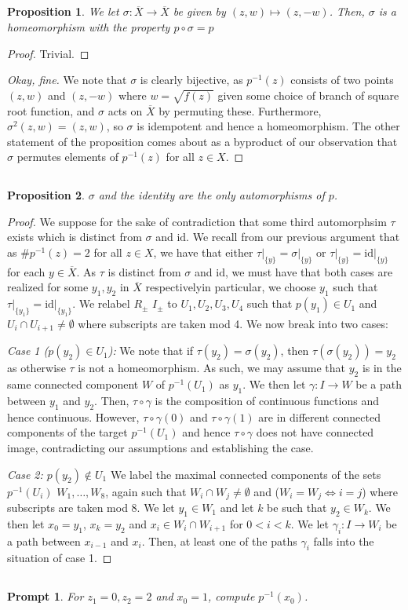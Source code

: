 \documentclass[english]{article}
\newcommand{\evat}[3]{\left. #1\right|_{#2}^{#3}}
\newcommand{\restr}[2]{\evat{#1}{#2}{}}
\newcommand{\prt}[1]{\setcounter{subsection}{#1-1}\subsection{}}
\newtheorem*{proposition*}{Proposition}
\newtheorem*{prompt*}{Prompt}
\theoremstyle{remark}
\theoremstyle{definition}
\newcommand{\id}{\mathrm{id}}
\newcommand{\oX}{\overline{X}}
\begin{document}
\prt{2}
\begin{proposition*}
	We let $\sigma:\oX\to\oX$ be given by $(z,w)\mapsto (z,-w)$. Then, $\sigma$ is a homeomorphism with the property $p\circ \sigma=p$
\end{proposition*}
\begin{proof}
	Trivial.
\end{proof}
\begin{proof}[Okay, fine]
	We note that $\sigma$ is clearly bijective, as $p^{-1}(z)$ consists of two points $(z,w)$ and $(z,-w)$ where $w=\sqrt{f(z)}$ given some choice of branch of square root function, and $\sigma$ acts on $\oX$ by permuting these. Furthermore, $\sigma^2(z,w)=(z,w)$, so $\sigma$ is idempotent and hence a homeomorphism. The other statement of the proposition comes about as a byproduct of our observation that $\sigma$ permutes elements of $p^{-1}(z)$ for all $z\in X$. 
\end{proof}
\prt{3}\begin{proposition*}
	$\sigma$ and the identity are the only automorphisms of $p$.
\end{proposition*}
\begin{proof} We suppose for the sake of contradiction that some third automorphsim $\tau$ exists which is distinct from $\sigma$ and $\id$. 
	We recall from our previous argument that as $\#p^{-1}(z)=2$ for all $z\in X$, we have that either $\restr{\tau}{\{y\}}=\restr{\sigma}{\{y\}}$ or $\restr{\tau}{\{y\}}=\restr{\id}{\{y\}}$ for each $y\in \oX$. As $\tau$ is distinct from $\sigma$ and $\id$, we must have that both cases are realized for some $y_1,y_2$ in $\oX$ respectively\textemdash in particular, we choose $y_1$ such that $\restr{\tau}{\{y_1\}}=\restr{\id}{\{y_1\}}$. We relabel $R_\pm$ $I_\pm$ to $U_1,U_2,U_3,U_4$ such that $p(y_1)\in U_1$ and $U_i\cap U_{i+1}\neq \emptyset$ where subscripts are taken mod 4. We now break into two cases:
	
	\emph{Case 1 ($p(y_2)\in U_1$):} We note that if $\tau(y_2)=\sigma(y_2)$, then $\tau(\sigma(y_2))=y_2$ as otherwise $\tau$ is not a homeomorphism. As such, we may assume that $y_2$ is in the same connected component $W$ of $p^{-1}(U_1)$ as $y_1$. We then let $\gamma:I\to W$ be a path between $y_1$ and $y_2$. Then, $\tau\circ \gamma$ is the composition of continuous functions and hence continuous. However, $\tau\circ\gamma(0)$ and $\tau\circ \gamma (1)$ are in different connected components of the target $p^{-1}(U_1)$ and hence $\tau\circ \gamma$ does not have connected image, contradicting our assumptions and establishing the case.
	
	\emph{Case 2: $p(y_2)\notin U_1$} We label the maximal connected components of the sets $p^{-1}(U_i)$ $W_1,\hdots,W_8$, again such that $W_i\cap W_j\neq \emptyset$ and ($W_i=W_j\iff i=j$) where subscripts are taken mod 8. We let $y_1\in W_1$ and let $k$ be such that $y_2\in W_k$. We then let $x_0=y_1$, $x_k=y_2$ and $x_i\in W_i\cap W_{i+1}$ for $0<  i <k$. We let $\gamma_i:I\to W_i$ be a path between $x_{i-1}$ and $x_i$. Then, at least one of the paths $\gamma_i$ falls into the situation of case 1.
\end{proof}\prt{4}\begin{prompt*}
For $z_1=0,z_2=2$ and $x_0=1$, compute $p^{-1}(x_0)$. 
\end{prompt*}
\end{document}
